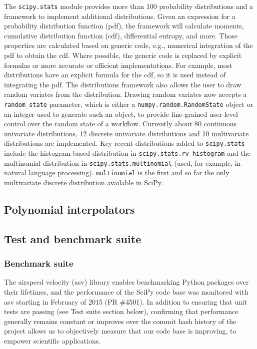 \documentclass[fleqn,10pt]{wlscirep}
\begin{document}
The \texttt{scipy.stats} module provides more than 100 probability
distributions and a framework to implement additional distributions. Given an
expression for a probability distribution function (pdf), the framework will
calculate moments, cumulative distribution function (cdf), differential
entropy, and more. Those properties are calculated based on generic code, e.g.,
numerical integration of the pdf to obtain the cdf.  Where possible, the
generic code is replaced by explicit formulas or more accurate or efficient
implementations. For example, most distributions have an explicit formula for
the cdf, so it is used instead of integrating the pdf. The distributions
framework also allows the user to draw random variates from the distribution.
Drawing random variates now accepts a \texttt{random\_state} parameter, which
is either a \texttt{numpy.random.RandomState} object or an integer used to
generate such an object, to provide fine-grained user-level control over the
random state of a workflow.  Currently about 80 continuous univariate
distributions, 12 discrete univariate distributions and 10 multivariate
distributions are implemented.  Key recent distributions added to
\texttt{scipy.stats} include the histogram-based distribution in
\texttt{scipy.stats.rv\_histogram} and the multinomial distribution in
\texttt{scipy.stats.multinomial} (used, for example, in natural language
processing\cite{Griffiths5228}). \texttt{multinomial} is the first and so far
the only multivariate discrete distribution available in SciPy.


\subsection*{Polynomial interpolators}



\subsection*{Test and benchmark suite}

\subsubsection*{Benchmark suite}

The airspeed velocity (asv\cite{asvref}) library enables benchmarking Python packages
over their lifetimes, and the performance of the SciPy code base was monitored
with asv starting in February of 2015 (PR \#4501). In addition to ensuring that
unit tests are passing (see Test suite section below), confirming 
that performance generally
remains constant or improves over the commit hash history of the project allows
us to objectively measure that our code base is improving, to empower
scientific applications.
\end{document}
